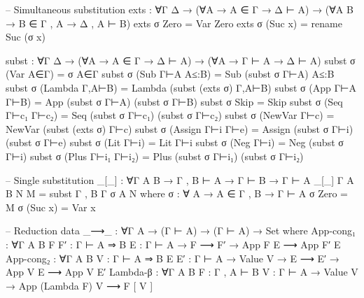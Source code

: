 \documentclass{article}
\begin{document}
\begin{prev}
\begin{code}
-- Simultaneous substitution
exts : ∀{Γ Δ} → (∀{A} → A ∈ Γ → Δ ⊢ A) 
              → (∀{A B} → B ∈ Γ , A → Δ , A ⊢ B)
exts σ Zero = Var Zero
exts σ (Suc x) = rename Suc (σ x)

subst : ∀{Γ Δ} → (∀{A} → A ∈ Γ → Δ ⊢ A)
               → (∀{A} → Γ ⊢ A → Δ ⊢ A)
subst σ (Var A∈Γ) = σ A∈Γ
subst σ (Sub Γ⊢A A≤:B) = Sub (subst σ Γ⊢A) A≤:B
subst σ (Lambda Γ,A⊢B) = Lambda (subst (exts σ) Γ,A⊢B)
subst σ (App Γ⊢A Γ⊢B) = App (subst σ Γ⊢A) (subst σ Γ⊢B)
subst σ Skip = Skip
subst σ (Seq Γ⊢c₁ Γ⊢c₂) = Seq (subst σ Γ⊢c₁) (subst σ Γ⊢c₂)
subst σ (NewVar Γ⊢c) = NewVar (subst (exts σ) Γ⊢c)
subst σ (Assign Γ⊢i Γ⊢e) = Assign (subst σ Γ⊢i) (subst σ Γ⊢e)
subst σ (Lit Γ⊢i) = Lit Γ⊢i
subst σ (Neg Γ⊢i) = Neg (subst σ Γ⊢i)
subst σ (Plus Γ⊢i₁ Γ⊢i₂) = Plus (subst σ Γ⊢i₁) (subst σ Γ⊢i₂)

-- Single substitution
_[_] : ∀{Γ A B} → Γ , B ⊢ A → Γ ⊢ B → Γ ⊢ A
_[_] {Γ} {A} {B} N M = subst {Γ , B} {Γ} σ {A} N
    where
    σ : ∀ {A} → A ∈ Γ , B → Γ ⊢ A
    σ Zero = M
    σ (Suc x) = Var x

-- Reduction
data _⟶_ : ∀{Γ A} → (Γ ⊢ A) → (Γ ⊢ A) → Set where
    App-cong₁ : ∀{Γ A B} {F F′ : Γ ⊢ A ⇒ B} {E : Γ ⊢ A} 
                    → F ⟶ F′ → App F E ⟶ App F′ E
    App-cong₂ : ∀{Γ A B} {V : Γ ⊢ A ⇒ B} {E E′ : Γ ⊢ A} 
                    → Value V → E ⟶ E′ → App V E ⟶ App V E′
    Lambda-β : ∀{Γ A B} {F : Γ , A ⊢ B} {V : Γ ⊢ A}
                    → Value V → App (Lambda F) V ⟶ F [ V ]
\end{code}
\end{prev}
\end{document}
